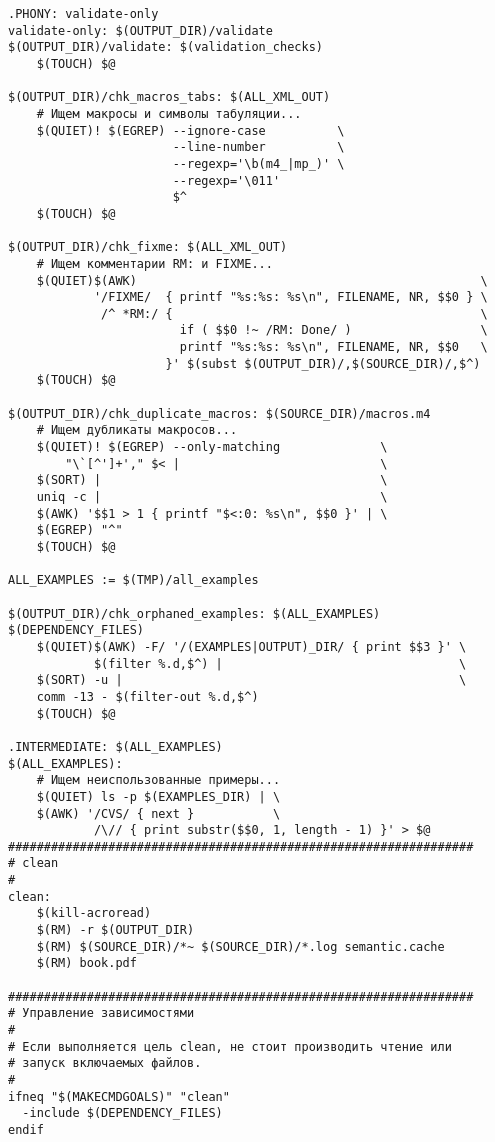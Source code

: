 {\begin{verbatim}
.PHONY: validate-only
validate-only: $(OUTPUT_DIR)/validate
$(OUTPUT_DIR)/validate: $(validation_checks)
    $(TOUCH) $@

$(OUTPUT_DIR)/chk_macros_tabs: $(ALL_XML_OUT)
    # Ищем макросы и символы табуляции...
    $(QUIET)! $(EGREP) --ignore-case          \
                       --line-number          \
                       --regexp='\b(m4_|mp_)' \
                       --regexp='\011'
                       $^
    $(TOUCH) $@

$(OUTPUT_DIR)/chk_fixme: $(ALL_XML_OUT)
    # Ищем комментарии RM: и FIXME...
    $(QUIET)$(AWK)                                                \
            '/FIXME/  { printf "%s:%s: %s\n", FILENAME, NR, $$0 } \
             /^ *RM:/ {                                           \
                        if ( $$0 !~ /RM: Done/ )                  \
                        printf "%s:%s: %s\n", FILENAME, NR, $$0   \
                      }' $(subst $(OUTPUT_DIR)/,$(SOURCE_DIR)/,$^) 
    $(TOUCH) $@ 

$(OUTPUT_DIR)/chk_duplicate_macros: $(SOURCE_DIR)/macros.m4
    # Ищем дубликаты макросов...
    $(QUIET)! $(EGREP) --only-matching              \
        "\`[^']+'," $< |                            \
    $(SORT) |                                       \
    uniq -c |                                       \
    $(AWK) '$$1 > 1 { printf "$<:0: %s\n", $$0 }' | \
    $(EGREP) "^"
    $(TOUCH) $@

ALL_EXAMPLES := $(TMP)/all_examples

$(OUTPUT_DIR)/chk_orphaned_examples: $(ALL_EXAMPLES) $(DEPENDENCY_FILES)
    $(QUIET)$(AWK) -F/ '/(EXAMPLES|OUTPUT)_DIR/ { print $$3 }' \
            $(filter %.d,$^) |                                 \
    $(SORT) -u |                                               \
    comm -13 - $(filter-out %.d,$^)
    $(TOUCH) $@

.INTERMEDIATE: $(ALL_EXAMPLES)
$(ALL_EXAMPLES):
    # Ищем неиспользованные примеры...
    $(QUIET) ls -p $(EXAMPLES_DIR) | \
    $(AWK) '/CVS/ { next }           \
            /\// { print substr($$0, 1, length - 1) }' > $@
#################################################################
# clean
#
clean:
    $(kill-acroread)
    $(RM) -r $(OUTPUT_DIR)
    $(RM) $(SOURCE_DIR)/*~ $(SOURCE_DIR)/*.log semantic.cache
    $(RM) book.pdf

#################################################################
# Управление зависимостями
#
# Если выполняется цель clean, не стоит производить чтение или
# запуск включаемых файлов.
#
ifneq "$(MAKECMDGOALS)" "clean"
  -include $(DEPENDENCY_FILES)
endif


\end{verbatim}}
